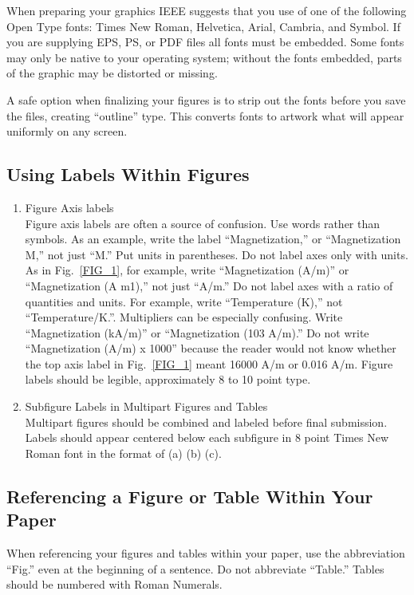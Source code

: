 \documentclass[journal]{IEEEtranTIE}
\begin{document}
When preparing your graphics IEEE suggests that you use of one of the following Open Type fonts: Times New Roman, Helvetica, Arial, Cambria, and Symbol. If you are supplying EPS, PS, or PDF files all fonts must be embedded. Some fonts may only be native to your operating system; without the fonts embedded, parts of the graphic may be distorted or missing.

A safe option when finalizing your figures is to strip out the fonts before you save the files, creating ``outline'' type. This converts fonts to artwork what will appear uniformly on any screen.


\subsection{Using Labels Within Figures}

\begin{enumerate}
	\item Figure Axis labels\\
	Figure axis labels are often a source of confusion. Use words rather than symbols. As an example, write the label ``Magnetization,'' or ``Magnetization M,'' not just ``M.'' Put units in parentheses. Do not label axes only with units. As in \mbox{Fig. \ref{FIG_1}}, for example, write ``Magnetization (A/m)'' or ``Magnetization (A m1),'' not just ``A/m.'' Do not label axes with a ratio of quantities and units. For example, write ``Temperature (K),'' not ``Temperature/K.''. Multipliers can be especially confusing. Write ``Magnetization (kA/m)'' or ``Magnetization (103 A/m).'' Do not write ``Magnetization (A/m) x 1000'' because the reader would not know whether the top axis label in \mbox{Fig. \ref{FIG_1}} meant 16000 A/m or 0.016 A/m. Figure labels should be legible, approximately 8 to 10 point type.	
	\item Subfigure Labels in Multipart Figures and Tables\\
	Multipart figures should be combined and labeled before final submission. Labels should appear centered below each subfigure in 8 point Times New Roman font in the format of (a) (b) (c). 	
\end{enumerate}

\subsection{Referencing a Figure or Table Within Your Paper}
When referencing your figures and tables within your paper, use the abbreviation ``Fig.'' even at the beginning of a sentence. Do not abbreviate ``Table.'' Tables should be numbered with Roman Numerals.
\end{document}
